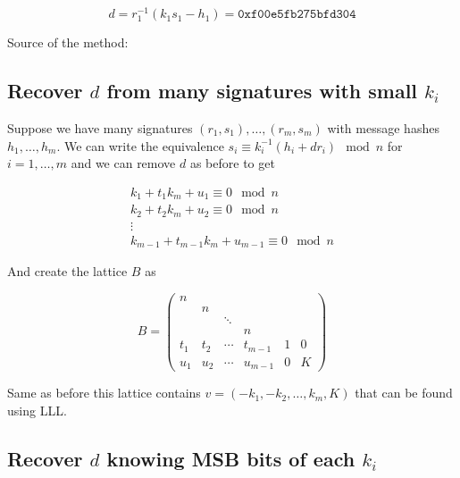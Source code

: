 \documentclass[a4paper,12pt]{report}
\begin{document}
\[
    d = r_1^{-1}(k_1s_1 - h_1) = \texttt{0xf00e5fb275bfd304}
\]

Source of the method:


\subsection{Recover $d$ from many signatures with small $k_i$}

Suppose we have many signatures $(r_1, s_1), \ldots, (r_m, s_m)$ with message hashes $h_1, \ldots, h_m$. We can write the equivalence
$s_i \equiv k_i^{-1}(h_i +  dr_i) \mod n$ for $i = 1,\ldots,m$ and we can remove $d$ as before to get

\[
\begin{array}{c}
    k_1 + t_1k_m + u_1 \equiv 0 \mod n \\
    k_2 + t_2k_m + u_2 \equiv 0 \mod n \\
    \vdots \\
    k_{m-1} + t_{m-1}k_m + u_{m-1} \equiv 0 \mod n
\end{array}
\]

\vspace*{10px}

And create the lattice $B$ as

\[
    B = 
    \begin{pmatrix}
     n &  \\
     & n \\
     & & \ddots \\
     & & & n \\
     t_1 & t_2 & \cdots & t_{m-1} & 1 & 0 \\
     u_1 & u_2 & \cdots & u_{m-1} & 0 & K
     \label{eq:lattice_ecdsa}
    \end{pmatrix}
\]

\vspace*{10px}

Same as before this lattice contains $v = (-k_1, -k_2, \ldots, k_m, K)$ that can be found using LLL.

\subsection{Recover $d$ knowing MSB bits of each $k_i$}
\end{document}
